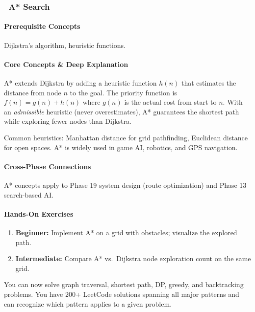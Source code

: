 \documentclass[11pt, a4paper, oneside]{report}
\newcommand{\awareness}[1]{\subsubsection{\texorpdfstring{\fcolorbox{gray!50}{gray!10}{\footnotesize\bfseries\color{gray!50!black} AWARENESS}~#1}{#1}}}
\begin{document}
\awareness{A* Search}

\paragraph{Prerequisite Concepts} Dijkstra's algorithm, heuristic functions.

\paragraph{Core Concepts \& Deep Explanation} A* extends Dijkstra by adding a heuristic function $h(n)$ that estimates the distance from node $n$ to the goal. The priority function is $f(n) = g(n) + h(n)$ where $g(n)$ is the actual cost from start to $n$. With an \emph{admissible} heuristic (never overestimates), A* guarantees the shortest path while exploring fewer nodes than Dijkstra.

Common heuristics: Manhattan distance for grid pathfinding, Euclidean distance for open spaces. A* is widely used in game AI, robotics, and GPS navigation.

\paragraph{Cross-Phase Connections} A* concepts apply to Phase 19 system design (route optimization) and Phase 13 search-based AI.

\paragraph{Hands-On Exercises}
\begin{enumerate}[leftmargin=*]
\item \textbf{Beginner:} Implement A* on a grid with obstacles; visualize the explored path.
\item \textbf{Intermediate:} Compare A* vs.\ Dijkstra node exploration count on the same grid.
\end{enumerate}

\begin{microcheckpoint}
You can now solve graph traversal, shortest path, DP, greedy, and backtracking problems. You have 200+ LeetCode solutions spanning all major patterns and can recognize which pattern applies to a given problem.
\end{microcheckpoint}
\end{document}

